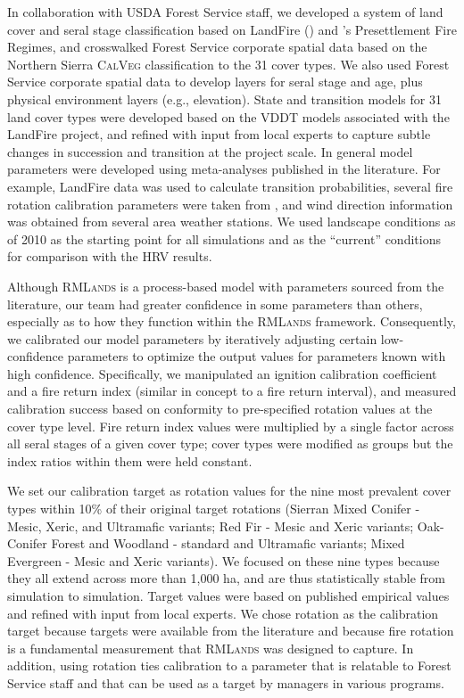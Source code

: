 In collaboration with USDA Forest Service staff, we developed a system of land cover and seral stage classification based on LandFire () and \citet{VandeWater2011}'s Presettlement Fire Regimes, and crosswalked Forest Service corporate spatial data based on the Northern Sierra \textsc{CalVeg} classification to the 31 cover types. We also used Forest Service corporate spatial data to develop layers for seral stage and age, plus physical environment layers (e.g., elevation). State and transition models for 31 land cover types were developed based on the VDDT models associated with the LandFire project, and refined with input from local experts to capture subtle changes in succession and transition at the project scale. In general model parameters were developed using meta-analyses published in the literature. For example, LandFire data was used to calculate transition probabilities, several fire rotation calibration parameters were taken from \citet{Mallek2013}, and wind direction information was obtained from several area weather stations. We used landscape conditions as of 2010 as the starting point for all simulations and as the ``current'' conditions for comparison with the HRV results.

Although \textsc{RMLands} is a process-based model with parameters sourced from the literature, our team had greater confidence in some parameters than others, especially as to how they function within the \textsc{RMLands} framework. Consequently, we calibrated our model parameters by iteratively adjusting certain low-confidence parameters to optimize the output values for parameters known with high confidence. Specifically, we manipulated an ignition calibration coefficient and a fire return index (similar in concept to a fire return interval), and measured calibration success based on conformity to pre-specified rotation values at the cover type level. Fire return index values were multiplied by a single factor across all seral stages of a given cover type; cover types were modified as groups but the index ratios within them were held constant.

We set our calibration target as rotation values for the nine most prevalent cover types within 10\% of their original target rotations (Sierran Mixed Conifer - Mesic, Xeric, and Ultramafic variants; Red Fir - Mesic and Xeric variants; Oak-Conifer Forest and Woodland - standard and Ultramafic variants; Mixed Evergreen - Mesic and Xeric variants). We focused on these nine types because they all extend across more than 1,000 ha, and are thus statistically stable from simulation to simulation. Target values were based on published empirical values and refined with input from local experts. We chose rotation as the calibration target because targets were available from the literature and because fire rotation is a fundamental measurement that \textsc{RMLands} was designed to capture. In addition, using rotation ties calibration to a parameter that is relatable to Forest Service staff and that can be used as a target by managers in various programs.

